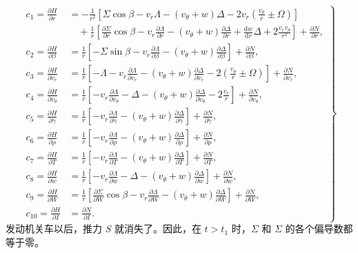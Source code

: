 \begin{equation}\label{eq:ch13_c_coeff}
\left.
\begin{aligned}
c_1 = \frac{\partial H}{\partial r} &= -\frac{1}{r^2} \left[ \Sigma \cos\beta - v_r \Lambda - (v_\theta + w) \Delta - 2 v_r \left( \frac{v_\theta}{r} \pm \Omega \right) \right] \\
&\quad + \frac{1}{r} \left[ \frac{\partial \Sigma}{\partial r} \cos\beta - v_r \frac{\partial \Lambda}{\partial r} - (v_\theta + w) \frac{\partial \Delta}{\partial r} + \frac{\mathrm{d}w}{\mathrm{d}r} \Delta + 2 \frac{v_r v_\theta}{r^2} \right] + \frac{\partial N}{\partial r}, \\
c_2 = \frac{\partial H}{\partial \beta} &= \frac{1}{r} \left[ -\Sigma \sin\beta - v_r \frac{\partial \Lambda}{\partial \beta} - (v_\theta + w) \frac{\partial \Delta}{\partial \beta} \right] + \frac{\partial N}{\partial \beta}, \\
c_3 = \frac{\partial H}{\partial v_r} &= \frac{1}{r} \left[ -\Lambda - v_r \frac{\partial \Lambda}{\partial v_r} - (v_\theta + w) \frac{\partial \Delta}{\partial v_r} - 2 \left( \frac{v_\theta}{r} \pm \Omega \right) \right] + \frac{\partial N}{\partial v_r}, \\
c_4 = \frac{\partial H}{\partial v_\theta} &= \frac{1}{r} \left[ -v_r \frac{\partial \Lambda}{\partial v_\theta} - \Delta - (v_\theta + w) \frac{\partial \Delta}{\partial v_\theta} - 2 \frac{v_r}{r} \right] + \frac{\partial N}{\partial v_\theta}, \\
c_5 = \frac{\partial H}{\partial \gamma} &= \frac{1}{r} \left[ -v_r \frac{\partial \Lambda}{\partial \gamma} - (v_\theta + w) \frac{\partial \Delta}{\partial \gamma} \right] + \frac{\partial N}{\partial \gamma}, \\
c_6 = \frac{\partial H}{\partial \rho} &= \frac{1}{r} \left[ -v_r \frac{\partial \Lambda}{\partial \rho} - (v_\theta + w) \frac{\partial \Delta}{\partial \rho} \right] + \frac{\partial N}{\partial \rho}, \\
c_7 = \frac{\partial H}{\partial T} &= \frac{1}{r} \left[ -v_r \frac{\partial \Lambda}{\partial T} - (v_\theta + w) \frac{\partial \Delta}{\partial T} \right] + \frac{\partial N}{\partial T}, \\
c_8 = \frac{\partial H}{\partial w} &= \frac{1}{r} \left[ -v_r \frac{\partial \Lambda}{\partial w} - \Delta - (v_\theta + w) \frac{\partial \Delta}{\partial w} \right] + \frac{\partial N}{\partial w}, \\
c_9 = \frac{\partial H}{\partial W} &= \frac{1}{r} \left[ \frac{\partial \Sigma}{\partial W} \cos\beta - v_r \frac{\partial \Lambda}{\partial W} - (v_\theta + w) \frac{\partial \Delta}{\partial W} \right] + \frac{\partial N}{\partial W}, \\
c_{10} = \frac{\partial H}{\partial I} &= \frac{\partial N}{\partial I}.
\end{aligned}
\right\}
\end{equation}
发动机关车以后，推力 $S$ 就消失了。因此，在 $t>t_1$ 时，$\Sigma$ 和 $\Sigma$ 的各个偏导数都等于零。